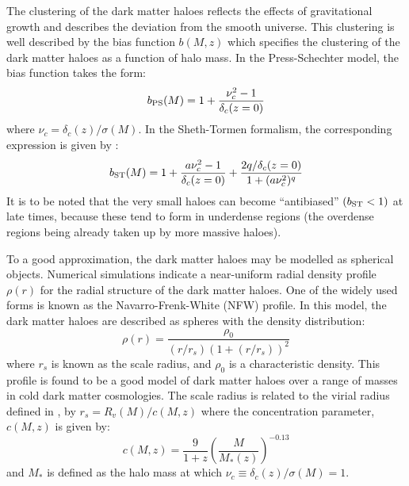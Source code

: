  The clustering of the dark matter haloes 
 reflects the effects of gravitational growth and
 describes the deviation from the smooth universe. This clustering is well described by the bias function $b(M,z)$ which specifies the clustering of the dark matter haloes as a function of halo mass.
 In the Press-Schechter model,  the bias function takes the form:
 \begin{equation}
b_{\rm PS}(M)  = 1 + \frac{\nu_c^2 - 1}{\delta_{c} (z = 0)}   
\end{equation} 
where $\nu_c = \delta_c(z)/\sigma(M)$. In the Sheth-Tormen formalism, the corresponding expression is given by \cite{scoccimarro2001}:
\begin{equation}
 b_{\rm ST}(M)  = 1 + \frac{a \nu_c^2 - 1}{\delta_{c} (z = 0)} + \frac{2 q/\delta_{c} (z = 0)}{1 + (a \nu_c^2)^q}
\end{equation} 
It is to be noted that the very small haloes can become ``antibiased'' $(b_{\rm ST} < 1)$ at late times, because these tend to form in underdense regions (the overdense regions being already taken up by more massive haloes).

To a good approximation, the dark matter haloes may be modelled as spherical objects. Numerical simulations indicate a near-uniform radial density profile $\rho(r)$ for the radial structure of the dark matter haloes. One of the widely used forms is known as the Navarro-Frenk-White (NFW) profile. In this model, the dark matter haloes are described as spheres with the density distribution:
\begin{equation}
 \rho(r) = \frac{\rho_0}{(r/r_s)(1 + (r/r_s))^2} 
\end{equation} 
where $r_s$ is known as the scale radius, and $\rho_0$ is a characteristic density. This profile is found to be a good model of dark matter haloes over a range of masses in cold dark matter cosmologies. The scale radius is related to the virial radius defined in , by $r_s = R_v(M)/c(M,z)$ where the concentration parameter, $c(M,z)$ is given by:
\begin{equation}
    c(M,z)  = \frac{9}{1+z} \left(\frac{M}{M_*(z)}\right)^{-0.13}
    \label{concparamdm}
\end{equation}
and $M_*$ is defined as the halo mass at which $\nu_c \equiv \delta_c(z)/\sigma(M) = 1$.

